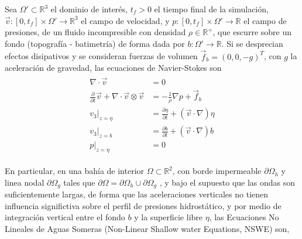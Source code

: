 Sea  $\Omega' \subset \mathbb{R}^3$ el dominio de inter\'es, $t_f>0$ el tiempo final de la simulaci\'on,   $\vec v : [0,t_f]\times \Omega' \rightarrow  \mathbb{R}^3$ el campo de velocidad, y $p : [0,t_f] \times \Omega' \rightarrow \mathbb{R}$ el campo de presiones, de un fluido incompresible con densidad $\rho \in \mathbb{R}^+$, que escurre sobre un fondo (topograf\'ia - batimetr\'ia) de forma dada por $b:\Omega' \rightarrow \mathbb{R}$. Si se desprecian efectos disipativos y se consideran fuerzas de volumen $\vec f_b = (0,0,-g)^T$, con $g$ la aceleraci\'on de gravedad, las ecuaciones de Navier-Stokes son \cite{toro}
\begin{align}
  \begin{split}
    \nabla \cdot \vec v &= 0 \\
    \frac{\partial }{\partial t}\vec v + \nabla \cdot \vec v \otimes \vec v  &= -\frac{1}{\rho}\nabla p + \vec f_b    \\
    v_3|_{z=\eta	} &= \frac{\partial \eta}{\partial t}+(\vec v \cdot \nabla )\eta \\
    v_3|_{z=b} &= \frac{\partial b}{\partial t} + (\vec v \cdot \nabla )b \\    
    p|_{z = \eta} &= 0
  \end{split}  
  \label{NS-incompresible}
\end{align}

En particular, en una bah\'ia de interior $\Omega \subset \mathbb{R}^2$, con borde impermeable $\partial\Omega_h$ y linea nodal $\partial \Omega_g$ tales que $\partial \Omega = \partial \Omega_h \cup \partial \Omega_g$ , y bajo el supuesto que las ondas son suficientemente largas, de forma que las aceleraciones verticales no tienen influencia significtiva sobre el perfil de presiones hidrost\'atico, y por medio de integraci\'on vertical entre el fondo $b$ y la superficie libre $\eta$, las Ecuaciones No Lineales de Aguas Someras (Non-Linear Shallow water Equations, NSWE) son, 

